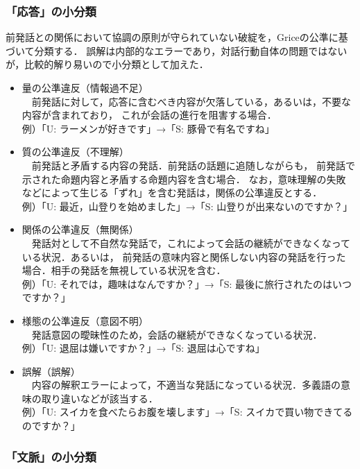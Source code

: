 \documentclass[japanese]{jnlp_1.4}
\begin{document}
\subsubsection{「応答」の小分類}

前発話との関係において協調の原則が守られていない破綻を，Griceの公準に基づいて分類する．
誤解は内部的なエラーであり，対話行動自体の問題ではないが，比較的解り易いので小分類として加えた．

\begin{itemize}
\item 量の公準違反（情報過不足）\\
　前発話に対して，応答に含むべき内容が欠落している，あるいは，不要な内容が含まれており，
これが会話の進行を阻害する場合．\\
例）「U: ラーメンが好きです」→「S: 豚骨で有名ですね」

\item 質の公準違反（不理解）\\
　前発話と矛盾する内容の発話．前発話の話題に追随しながらも，
前発話で示された命題内容と矛盾する命題内容を含む場合．
なお，意味理解の失敗などによって生じる「ずれ」を含む発話は，関係の公準違反とする．\\
例）「U: 最近，山登りを始めました」→「S: 山登りが出来ないのですか？」

\item 関係の公準違反（無関係）\\
　発話対として不自然な発話で，これによって会話の継続ができなくなっている状況．あるいは，
前発話の意味内容と関係しない内容の発話を行った場合．相手の発話を無視している状況を含む．\\
例）「U: それでは，趣味はなんですか？」→「S: 最後に旅行されたのはいつですか？」

\item 様態の公準違反（意図不明）\\
　発話意図の曖昧性のため，会話の継続ができなくなっている状況．\\
例）「U: 退屈は嫌いですか？」→「S: 退屈は心ですね」

\item 誤解（誤解）\\
 　内容の解釈エラーによって，不適当な発話になっている状況．多義語の意味の取り違いなどが該当する．\\
 例）「U: スイカを食べたらお腹を壊します」→「S: スイカで買い物できてるのですか？」

\end{itemize}


\subsubsection{「文脈」の小分類}
\end{document}
